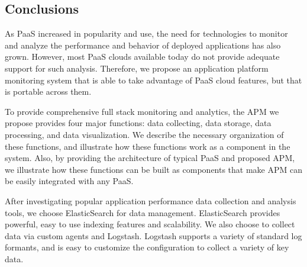 \subsection{Conclusions}
As PaaS increased in popularity and use, the need 
for technologies to monitor and analyze the performance and behavior of
deployed applications has also grown. 
However, most PaaS clouds available today do not provide adequate support
for such analysis.
Therefore, we propose an application platform monitoring system that 
is able to take advantage of PaaS cloud features, but that is portable
across them.

To provide comprehensive full stack monitoring and analytics, 
the APM we propose provides four major functions:
data collecting, data storage, data processing, and data visualization. 
We describe the necessary organization of
these functions, and illustrate how these functions work as 
a component in the system. Also, by providing the
architecture of typical PaaS and proposed APM, we illustrate how these functions can be built as components that
make APM can be easily integrated with any PaaS.

After investigating popular application performance data collection and analysis tools, we choose ElasticSearch for data management.
ElasticSearch provides powerful, easy to use indexing features and scalability. We also choose to collect data via custom agents and Logstash.
Logstash supports a variety of standard log formants,
and is easy to customize the configuration to collect a variety of key data.
